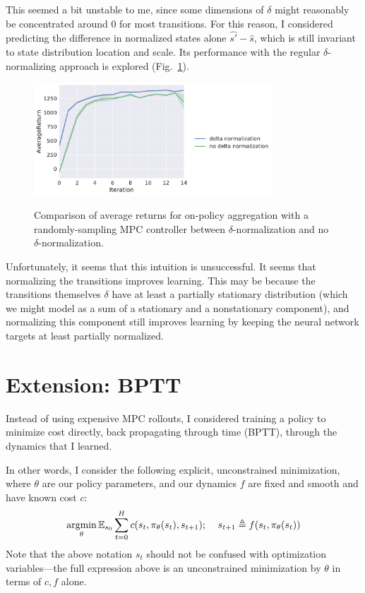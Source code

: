 \documentclass{article}
\begin{document}
This seemed a bit unstable to me, since some dimensions of $\delta$ might reasonably be concentrated around 0 for most transitions. For this reason, I considered predicting the difference in normalized states alone $\hat{s'}-\hat{s}$, which is still invariant to state distribution location and scale. Its performance with the regular $\delta$-normalizing approach is explored (Fig.~\ref{fig:deltanorm}).

\begin{figure}[!h]
  \begin{center}
    {\includegraphics[width=0.8\textwidth]{delta-AverageReturn.pdf}}
  \end{center}
  \caption{Comparison of average returns for on-policy aggregation with a randomly-sampling MPC controller between $\delta$-normalization and no $\delta$-normalization.}
\label{fig:deltanorm}
\end{figure}

Unfortunately, it seems that this intuition is unsuccessful. It seems that normalizing the transitions improves learning. This may be because the transitions themselves $\delta$ have at least a partially stationary distribution (which we might model as a sum of a stationary and a nonstationary component), and normalizing this component still improves learning by keeping the neural network targets at least partially normalized.

\FloatBarrier

\section{Extension: BPTT}

Instead of using expensive MPC rollouts, I considered training a policy to minimize cost directly, back propagating through time (BPTT), through the dynamics that I learned.

In other words, I consider the following explicit, unconstrained minimization, where $\theta$ are our policy parameters, and our dynamics $f$ are fixed and smooth and have known cost $c$:
$$
\operatorname*{argmin}_{\theta}\operatorname{\mathbb{E}}_{s_0}\sum_{t=0}^H c(s_t,\pi_{\theta}(s_{t}),s_{t+1});\;\;\;\; s_{t+1}\triangleq f(s_t,\pi_\theta(s_t))
$$
Note that the above notation $s_t$ should not be confused with optimization variables---the full expression above is an unconstrained minimization by $\theta$ in terms of $c,f$ alone.
\end{document}
